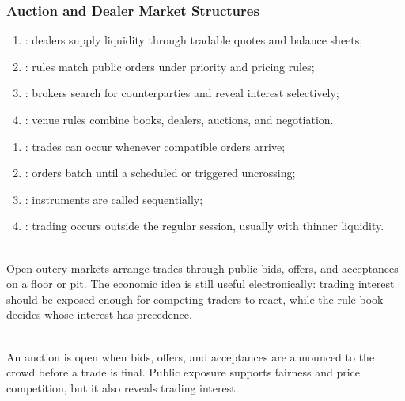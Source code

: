 \subsubsection{Auction and Dealer Market Structures}

\begin{taxonomy} 
\begin{enumerate}[label=\roman*.]
\setlength{\itemsep}{0pt}
\item {}: dealers supply liquidity through tradable quotes and balance sheets;
\item {}: rules match public orders under priority and pricing rules;
\item {}: brokers search for counterparties and reveal interest selectively;
\item {}: venue rules combine books, dealers, auctions, and negotiation.
\end{enumerate}
\end{taxonomy}

\begin{taxonomy} 
\begin{enumerate}[label=\roman*.]
\setlength{\itemsep}{0pt}
\item {}: trades can occur whenever compatible orders arrive;
\item {}: orders batch until a scheduled or triggered uncrossing;
\item {}: instruments are called sequentially;
\item {}: trading occurs outside the regular session, usually with thinner liquidity.
\end{enumerate}
\end{taxonomy}

\begin{mechanism} \\
Open-outcry markets arrange trades through public bids, offers, and acceptances on a floor or pit. The economic idea is still useful electronically: trading interest should be exposed enough for competing traders to react, while the rule book decides whose interest has precedence.
\end{mechanism}

\begin{marketrule} \\
An auction is open when bids, offers, and acceptances are announced to the crowd before a trade is final. Public exposure supports fairness and price competition, but it also reveals trading interest.
\end{marketrule}

